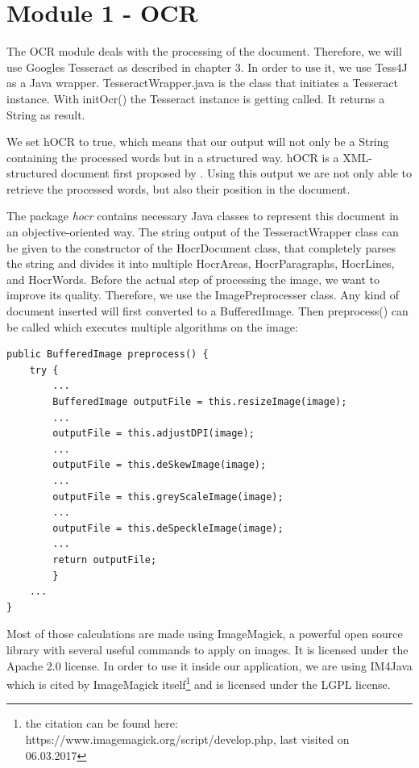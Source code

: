 \section{Module 1 - OCR}
\label{sec5.4}

The OCR module deals with the processing of the document. Therefore, we will use Googles Tesseract as described in chapter 3. In order to use it, we use Tess4J as a Java wrapper. TesseractWrapper.java is the class that initiates a Tesseract instance. With initOcr() the Tesseract instance is getting called. It returns a String as result. 

We set hOCR to true, which means that our output will not only be a String containing the processed words but in a structured way. hOCR is a XML-structured document first proposed by \cite{Breuel07}. Using this output we are not only able to retrieve the processed words, but also their position in the document.

The package \emph{hocr} contains necessary Java classes to represent this document in an objective-oriented way. The string output of the TesseractWrapper class can be given to the constructor of the HocrDocument class, that completely parses the string and divides it into multiple HocrAreas, HocrParagraphs, HocrLines, and HocrWords.
Before the actual step of processing the image, we want to improve its quality. Therefore, we use the ImagePreprocesser class. Any kind of document inserted will first converted to a BufferedImage. Then preprocess() can be called which executes multiple algorithms on the image:

\begin{lstlisting}[caption={Image preprocessing}]
public BufferedImage preprocess() {
    try {
        ...
        BufferedImage outputFile = this.resizeImage(image);
		...
        outputFile = this.adjustDPI(image);
		...
        outputFile = this.deSkewImage(image);
		...
        outputFile = this.greyScaleImage(image);
		...
        outputFile = this.deSpeckleImage(image);
		...
        return outputFile;
        } 
  	...
}
\end{lstlisting}

Most of those calculations are made using ImageMagick, a powerful open source library with several useful commands to apply on images. It is licensed under the Apache 2.0 license. In order to use it inside our application, we are using IM4Java which is cited by ImageMagick itself\footnote{the citation can be found here: https://www.imagemagick.org/script/develop.php, last visited on 06.03.2017} and is licensed under the LGPL license.

